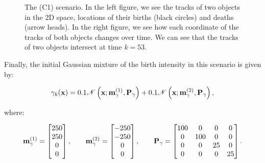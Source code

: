 \begin{figure}
\begin{subfigure}[]{0.48\linewidth}
\begin{subfigure}[b]{\linewidth}
        \end{subfigure}
    \end{subfigure}
  \caption[True tracks of objects in the (C1) scenario.]{The (C1) scenario. In the left figure, we see the tracks of two objects in the 2D space, locations of their births (black circles) and deaths (arrow heads). In the right figure, we see how each coordinate of the tracks of both objects changes over time. We can see that the tracks of two objects intersect at time $k=53$.}
  \label{fig:c1-scenario}
\end{figure}

Finally, the initial Gaussian mixture of the birth intensity in this scenario is given by:

\begin{equation}
    \gamma_k(\mathbf{x}) = 0.1 \mathscr{N}\left( \mathbf{x}; \svecat{m}{\gamma}{(1)}, \vecat{P}{\gamma} \right)
        + 0.1 \mathscr{N}\left( \mathbf{x}; \svecat{m}{\gamma}{(2)}, \vecat{P}{\gamma} \right),
\end{equation}

\noindent where:

\begin{equation}
    \svecat{m}{\gamma}{(1)} = \begin{bmatrix}
        250 \\
        250 \\
        0 \\
        0 \\
    \end{bmatrix},
    \qquad
    \svecat{m}{\gamma}{(2)} = \begin{bmatrix}
        -250 \\
        -250 \\
        0 \\
        0 \\
    \end{bmatrix},
    \qquad
    \vecat{P}{\gamma} = \begin{bmatrix}
        100 & 0     & 0     & 0     \\
        0   & 100   & 0     & 0     \\
        0   & 0     & 25    & 0     \\
        0   & 0     & 0     & 25    \\
    \end{bmatrix}.
\end{equation}
